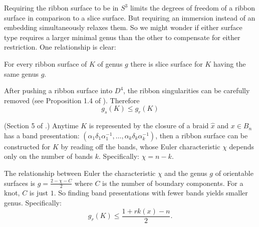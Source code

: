\documentclass[12pt]{thesis}
\begin{document}
Requiring the ribbon surface to be in $S^{3}$
limits the degrees of freedom of a ribbon surface in comparison to a slice surface.
But requiring an immersion instead of an embedding simultaneously relaxes them.
So we might wonder if either surface type requires a larger minimal genus than the other
to compensate for either restriction.
One relationship is clear:
\begin{proposition}
    For every ribbon surface of $K$ of genus $g$
    there is slice surface for $K$ having the same genus $g$.
\end{proposition}

After pushing a ribbon surface into $D^{4}$,
the ribbon singularities can be carefully removed (see Proposition 1.4 of \cite{rudolph-braided-surfaces}).
Therefore 
\begin{equation}
    \label{eq:slice-and-ribbon-genus}
    g_{s}(K) \leq g_{r}(K)
\end{equation}

\begin{proposition} (Section 5 of \cite{rudolph-braided-surfaces}.)
    Anytime $K$ is represented by the closure of a braid $\widehat{x}$ 
    and $x \in B_{n}$ has a band presentation: $(\alpha_{1} \delta_{1} \alpha_{1}^{-1}, \ldots, \alpha_{k} \delta_{k} \alpha_{k}^{-1})$,
    then a ribbon surface can be constructed for $K$ by reading off the bands,
    whose Euler characteristic $\chi$ depends only
    on the number of bands $k$.
    Specifically: $\chi = n - k$. 
\end{proposition}

The relationship between Euler the characteristic $\chi$
and the genus $g$ of orientable surfaces is $g = \frac{2 - \chi - C}{2}$ where $C$ is the number
of boundary components. For a knot, $C$ is just $1$.
So finding band presentations with fewer bands yields smaller genus.
Specifically: 
\begin{equation}
    \label{eq:rank-and-ribbon-genus}
    g_{r}(K) \leq \frac{1 + rk(x) - n}{2}.
\end{equation}
\end{document}
